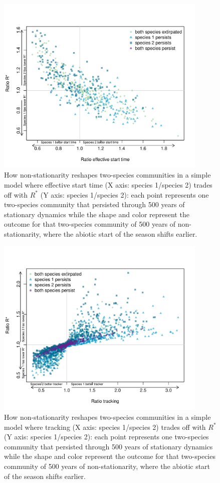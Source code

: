 \documentclass[11pt,letter]{article}
\begin{document}
\clearpage
\begin{figure}[t!]
\centering
\includegraphics[width=0.9\textwidth]{..//..//R/graphs/modelruns/manuscript/tauIPrstart1.pdf}
\caption{How non-stationarity reshapes two-species communities in a simple model where effective start time (X axis: species 1/species 2) trades off with $R^*$ (Y axis: species 1/species 2): each point represents one two-species community that persisted through 500 years of stationary dynamics while the shape and color represent the outcome for that two-species community of 500 years of non-stationarity, where the abiotic start of the season shifts earlier.}
 \label{fig:tauirstarsupp}
\end{figure}


\begin{figure}[t!]
\centering
\includegraphics[width=0.9\textwidth]{..//..//R/graphs/modelruns/manuscript/alpharstar.pdf}
\caption{How non-stationarity reshapes two-species communities in a simple model where tracking (X axis: species 1/species 2) trades off with $R^*$ (Y axis: species 1/species 2): each point represents one two-species community that persisted through 500 years of stationary dynamics while the shape and color represent the outcome for that two-species community of 500 years of non-stationarity, where the abiotic start of the season shifts earlier.}
\label{fig:alpharstarsupp}
\end{figure}
\end{document}
